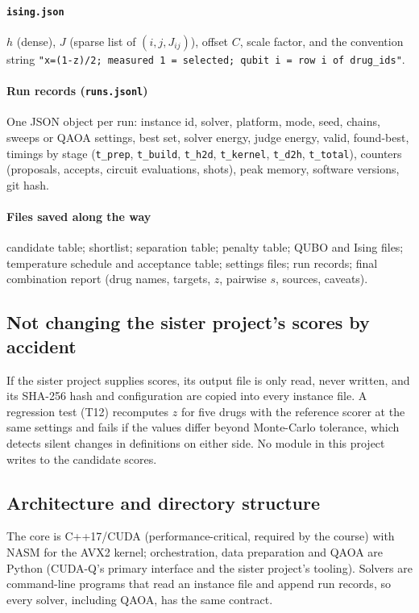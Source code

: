 \paragraph{\texttt{ising.json}} $h$ (dense), $J$ (sparse list of $(i,j,J_{ij})$), offset $C$, scale factor, and the convention string \texttt{"x=(1-z)/2; measured 1 = selected; qubit i = row i of drug\_ids"}.

\paragraph{Run records (\texttt{runs.jsonl})} One JSON object per run: instance id, solver, platform, mode, seed, chains, sweeps or QAOA settings, best set, solver energy, judge energy, valid, found-best, timings by stage (\texttt{t\_prep}, \texttt{t\_build}, \texttt{t\_h2d}, \texttt{t\_kernel}, \texttt{t\_d2h}, \texttt{t\_total}), counters (proposals, accepts, circuit evaluations, shots), peak memory, software versions, git hash.

\paragraph{Files saved along the way} candidate table; shortlist; separation table; penalty table; QUBO and Ising files; temperature schedule and acceptance table; settings files; run records; final combination report (drug names, targets, $z$, pairwise $s$, sources, caveats).

\subsection{Not changing the sister project's scores by accident}

If the sister project supplies scores, its output file is only read, never written, and its SHA-256 hash and configuration are copied into every instance file. A regression test (T12) recomputes $z$ for five drugs with the reference scorer at the same settings and fails if the values differ beyond Monte-Carlo tolerance, which detects silent changes in definitions on either side. No module in this project writes to the candidate scores.

\subsection{Architecture and directory structure}

The core is C++17/CUDA (performance-critical, required by the course) with NASM for the AVX2 kernel; orchestration, data preparation and QAOA are Python (CUDA-Q's primary interface and the sister project's tooling). Solvers are command-line programs that read an instance file and append run records, so every solver, including QAOA, has the same contract.

